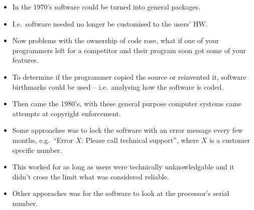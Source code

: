 \begin{frame}
  \begin{itemize}
    \item In the 1970's software could be turned into general packages.

    \item I.e.\ software needed no longer be customised to the users' HW\@.

    \item Now problems with the ownership of code rose, what if one of your 
      programmers left for a competitor and their program soon got some of your 
      features.

    \item To determine if the programmer copied the source or reinvented it, 
      software birthmarks could be used -- i.e.\ analysing how the software is 
      coded.
  \end{itemize}
\end{frame}

\begin{frame}
  \begin{itemize}
    \item Then came the 1980's, with these general purpose computer systems 
      came attempts at copyright enforcement.

    \item Some approaches was to lock the software with an error message every 
      few months, e.g.\ ``Error \(X\):  Please call technical support'', where 
      \(X\) is a customer specific number.

    \item This worked for as long as users were technically unknowledgable and 
      it didn't cross the limit what was considered reliable.

    \item Other apporaches was for the software to look at the processor's 
      serial number.
  \end{itemize}
\end{frame}

